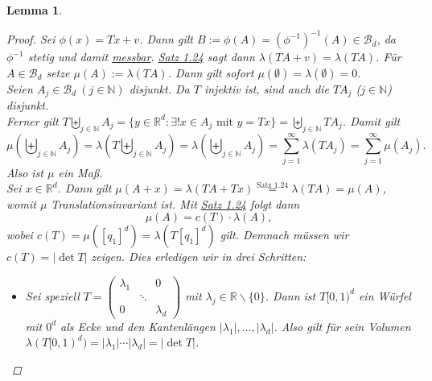 \documentclass[a4paper]{scrreprt}
\newcommand{\R}{\mathbb{R}}
\newcommand{\N}{\mathbb{N}}
\newcommand{\Borel}{\mathcal{B}}
\newcommand{\Bd}{\Borel_d}
\newcommand{\bigdcup}{\biguplus}
\newcommand{\jshortlink}[1]{\jhyperref{#1}{\text{#1}}}
\newcommand{\jhyperref}[2]{\hyperref[j_#1]{#2}}
\newcommand{\jlink}[1]{\jhyperref{#1}{#1}}
\theoremstyle{plain}
\newtheorem{lem}[thm]{Lemma}
\theoremstyle{definition}
\begin{document}
{{{{\begin{lem}
    \begin{proof}
        Sei $\phi(x) = Tx+v$. Dann gilt $B:=\phi(A) = (\phi^{-1})^{-1}(A)\in \Bd$, da $\phi^{-1}$ stetig und damit \jlink{messbar}. \jlink{Satz 1.24} sagt dann $\lambda(TA+v) = \lambda(TA)$. Für $A\in \Bd$ setze $\mu(A):=\lambda(TA)$. Dann gilt sofort $\mu(\emptyset) = \lambda(\emptyset) = 0$.\\
        Seien $A_j\in \Bd \ (j\in \N)$ disjunkt. Da $T$ injektiv ist, sind auch die $TA_j$ ($j\in\N$) disjunkt.\\
        Ferner gilt $T\bigdcup_{j\in\N}A_j = \{y\in \R^d : \exists! x \in A_j \text{ mit } y=Tx\} = \bigdcup_{j\in\N}TA_j$. Damit gilt
        \begin{displaymath}
            \mu\left( \bigdcup_{j\in\N} A_j \right) = \lambda \left(T \bigdcup_{j\in\N} A_j \right) = \lambda \left(\bigdcup_{j\in\N} A_j \right) = \sum_{j=1}^\infty \lambda(TA_j) = \sum_{j=1}^\infty \mu(A_j).
        \end{displaymath}
        Also ist $\mu$ ein Maß.\\
        Sei $x\in\R^d$. Dann gilt $\mu(A+x)= \lambda(TA+Tx) \overset{\jshortlink{Satz 1.24}}{=} \lambda(TA) = \mu(A)$, womit $\mu$ Translationsinvariant ist. Mit \jlink{Satz 1.24} folgt dann
        \begin{displaymath}
            \tag{$*$}
            \mu(A) = c(T)\cdot \lambda(A),
        \end{displaymath}
        wobei $c(T) = \mu([q_1]^d) = \lambda(T[q_1]^d)$ gilt. Demnach müssen wir $c(T) = |\det T|$ zeigen. Dies erledigen wir in drei Schritten:
        \begin{itemize}
            \item[1)] 
                Sei speziell $T =  \left(
                                        \begin{smallmatrix}
                                             \lambda_1 &        &  0       \\
                                                       & \ddots &          \\
                                             0         &        & \lambda_d
                                        \end{smallmatrix}
                                  \right)$ mit $\lambda_j \in \R\backslash \{0\}$. Dann ist $T[0,1)^d$ ein Würfel mit $0^d$ als Ecke und den Kantenlängen $|\lambda_1|,\dots, |\lambda_d|$. Also gilt für sein Volumen $\lambda(T[0,1)^d) = |\lambda_1|\cdots|\lambda_d| = |\det T|$.
            

\end{itemize}
\end{proof}
\end{lem}}}}}
\end{document}
